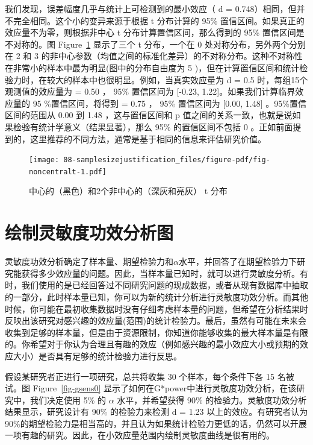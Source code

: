 \documentclass[
  letterpaper,
  DIV=11,
  numbers=noendperiod]{scrreprt}
\begin{document}
我们发现，误差幅度几乎与统计上可检测到的最小效应（ d =
0.748）相同，但并不完全相同。这个小的变异来源于根据 t 分布计算的 95\%
置信区间。如果真正的效应量不为零，则根据非中心 t
分布计算置信区间，那么得到的 95\% 置信区间是不对称的。图
Figure~\ref{fig-noncentralt} 显示了三个 t 分布，一个在 0
处对称分布，另外两个分别在 2 和 3
的非中心参数（均值之间的标准化差异）的不对称分布。这种不对称性在非常小的样本中最为明显(图中的分布自由度为
5
)，但在计算置信区间和统计检验力时，在较大的样本中也很明显。例如，当真实效应量为
d = 0.5 时，每组15个观测值的效应量为 = 0.50 ， 95\% 置信区间为 {[}-0.23,
1.22{]}。如果我们计算临界效应量的 95 \%置信区间，将得到 = 0.75 ， 95\%
置信区间为 {[}0.00, 1.48{]} 。95\%置信区间的范围从 0.00 到 1.48
，这与置信区间和 p
值之间的关系一致，也就是说如果检验有统计学意义（结果显著），那么 95\%
的置信区间不包括 0
。正如前面提到的，这里推荐的不同方法，通常是基于相同的信息来评估研究价值。

\begin{figure}

{\centering \texttt{[image: 08-samplesizejustification\_files/figure-pdf/fig-noncentralt-1.pdf]}

}

\caption{\label{fig-noncentralt}中心的（黑色）和2个非中心的（深灰和亮灰）
t 分布}

\end{figure}

\hypertarget{ux7ed8ux5236ux7075ux654fux5ea6ux529fux6548ux5206ux6790ux56fe}{%
\section{绘制灵敏度功效分析图}\label{ux7ed8ux5236ux7075ux654fux5ea6ux529fux6548ux5206ux6790ux56fe}}

灵敏度功效分析确定了样本量、期望检验力和\(\alpha\)水平，并回答了在期望检验力下研究能获得多少效应量的问题。因此，当样本量已知时，就可以进行灵敏度分析。有时，我们使用的是已经回答过不同研究问题的现成数据，或者从现有数据库中抽取的一部分，此时样本量已知，你可以为新的统计分析进行灵敏度功效分析。而其他时候，你可能在最初收集数据时没有仔细考虑样本量的问题，但希望在分析结果时反映出该研究对感兴趣的效应量(范围)的统计检验力。最后，虽然有可能在未来会收集到足够的样本量，但是由于资源限制，你知道你能够收集的最大样本量是有限的。你希望对于你认为合理且有趣的效应（例如感兴趣的最小效应大小或预期的效应大小）是否具有足够的统计检验力进行反思。

假设某研究者正进行一项研究，总共将收集 30 个样本，每个条件下各 15
名被试。图 Figure~\ref{fig-gsens0}
显示了如何在G*power中进行灵敏度功效分析，在该研究中，我们决定使用 5\% 的
\(\alpha\) 水平，并希望获得 90\%
的检验力。灵敏度功效分析结果显示，研究设计有 90\% 的检验力来检测 d =
1.23
以上的效应。有研究者认为90\%的期望检验力是相当高的，并且认为如果统计检验力更低的话，仍然可以开展一项有趣的研究。因此，在小效应量范围内绘制灵敏度曲线是很有用的。
\end{document}
